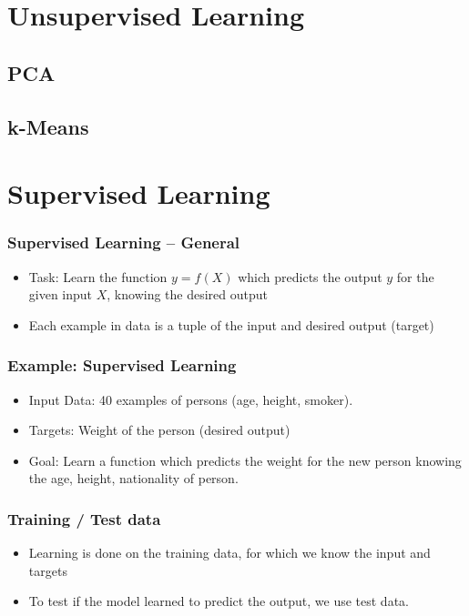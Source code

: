 \documentclass[english,final,compress]{beamer}
\begin{document}
\section{Unsupervised Learning}

\subsection{PCA}



\subsection{k-Means}



\section{Supervised Learning}


\begin{frame}
    \frametitle{Supervised Learning -- General}
    \begin{itemize}
	\item Task: Learn the function $ y = f(X) $ which predicts the output $y$ for the given input $X$, knowing the desired output
        \item Each example in data is a tuple of the input and desired output (target)
    \end{itemize}
\end{frame}


\begin{frame}
    \frametitle{Example: Supervised Learning}
    \begin{itemize}
       \item Input Data: 40 examples of persons (age, height, smoker). 
	\item Targets: Weight of the person (desired output)
	\item Goal: Learn a function which predicts the weight for the new person
		knowing the age, height, nationality of person.

    \end{itemize}
\end{frame}

\begin{frame}
    \frametitle{Training / Test data}
    \begin{itemize}
	\item Learning is done on the training data, for which we know the input and targets
	\item To test if the model learned to predict the output, we use test data. 		
    \end{itemize}
\end{frame}
\end{document}
